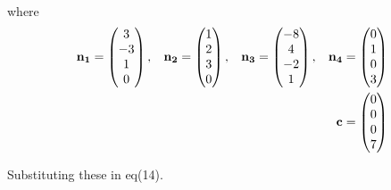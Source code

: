 \documentclass[10pt,a4paper]{report}
\newcommand{\myvec}[1]{\ensuremath{\begin{pmatrix}#1\end{pmatrix}}}
\let\vec\mathbf
\let\vec\mathbf
\begin{document}
\begin{multicols}{2}
\begin{align}
\end{align} 
where
\begin{align}
\vec{n_1}=\myvec{3\\-3\\1\\0},\hspace{3mm} \vec{n_2}=\myvec{1\\2\\3\\0}, \hspace{3mm} \vec{n_3}=\myvec{-8\\4\\-2\\1}, \hspace{3mm} \vec{n_4}=\myvec{0\\1\\0\\3}\\ \vec{c}=\myvec{0\\0\\0\\7}
\end{align} \vspace{2mm}

Substituting these in eq(14).\\


\end{multicols}
\end{document}
